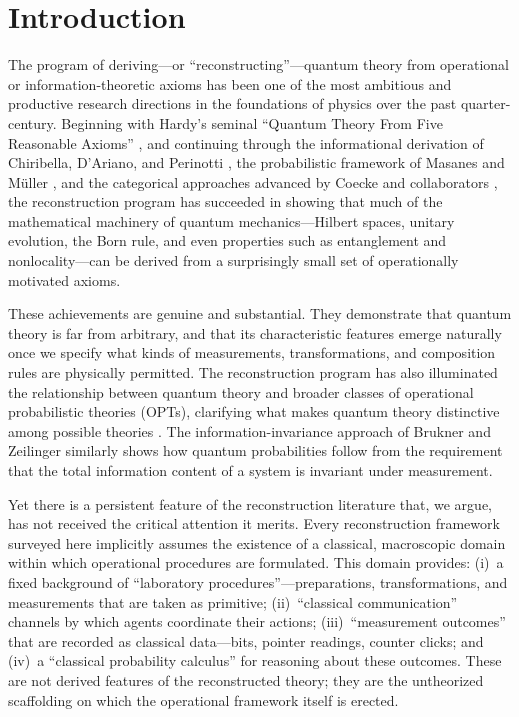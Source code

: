 \documentclass[12pt,a4paper,twoside]{article}
\begin{document}
\section{Introduction}

The program of deriving---or ``reconstructing''---quantum theory from operational or information-theoretic axioms has been one of the most ambitious and productive research directions in the foundations of physics over the past quarter-century. Beginning with Hardy's seminal ``Quantum Theory From Five Reasonable Axioms'' \cite{Hardy2001}, and continuing through the informational derivation of Chiribella, D'Ariano, and Perinotti \cite{Chiribella2011,DAriano2017}, the probabilistic framework of Masanes and M\"{u}ller \cite{Masanes2011}, and the categorical approaches advanced by Coecke and collaborators \cite{Coecke2010,Selby2021}, the reconstruction program has succeeded in showing that much of the mathematical machinery of quantum mechanics---Hilbert spaces, unitary evolution, the Born rule, and even properties such as entanglement and nonlocality---can be derived from a surprisingly small set of operationally motivated axioms.

These achievements are genuine and substantial. They demonstrate that quantum theory is far from arbitrary, and that its characteristic features emerge naturally once we specify what kinds of measurements, transformations, and composition rules are physically permitted. The reconstruction program has also illuminated the relationship between quantum theory and broader classes of operational probabilistic theories (OPTs), clarifying what makes quantum theory distinctive among possible theories \cite{Barrett2007,Barnum2007}. The information-invariance approach of Brukner and Zeilinger \cite{Brukner2009} similarly shows how quantum probabilities follow from the requirement that the total information content of a system is invariant under measurement.

Yet there is a persistent feature of the reconstruction literature that, we argue, has not received the critical attention it merits. Every reconstruction framework surveyed here implicitly assumes the existence of a classical, macroscopic domain within which operational procedures are formulated. This domain provides: (i)~a fixed background of ``laboratory procedures''---preparations, transformations, and measurements that are taken as primitive; (ii)~``classical communication'' channels by which agents coordinate their actions; (iii)~``measurement outcomes'' that are recorded as classical data---bits, pointer readings, counter clicks; and (iv)~a ``classical probability calculus'' for reasoning about these outcomes. These are not derived features of the reconstructed theory; they are the untheorized scaffolding on which the operational framework itself is erected.
\end{document}
